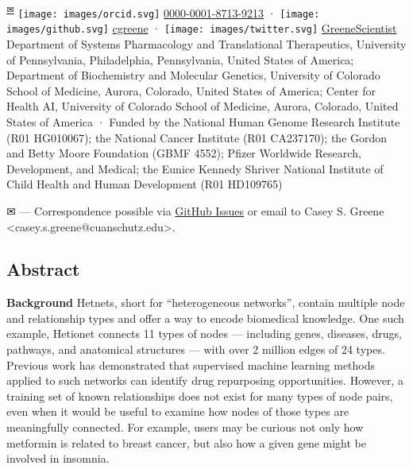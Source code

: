 \begin{itemize}
  \textsuperscript{\protect\hyperlink{correspondence}{✉}}
  \texttt{[image: images/orcid.svg]}
  \href{https://orcid.org/0000-0001-8713-9213}{0000-0001-8713-9213}
  · \texttt{[image: images/github.svg]}
  \href{https://github.com/cgreene}{cgreene}
  · \texttt{[image: images/twitter.svg]}
  \href{https://twitter.com/GreeneScientist}{GreeneScientist}
  Department of Systems Pharmacology and Translational Therapeutics, University of Pennsylvania, Philadelphia, Pennsylvania, United States of America; Department of Biochemistry and Molecular Genetics, University of Colorado School of Medicine, Aurora, Colorado, United States of America; Center for Health AI, University of Colorado School of Medicine, Aurora, Colorado, United States of America
  · Funded by the National Human Genome Research Institute (R01 HG010067); the National Cancer Institute (R01 CA237170); the Gordon and Betty Moore Foundation (GBMF 4552); Pfizer Worldwide Research, Development, and Medical; the Eunice Kennedy Shriver National Institute of Child Health and Human Development (R01 HD109765)
\end{itemize}

\leavevmode{}%
✉ --- Correspondence possible via \href{https://github.com/greenelab/connectivity-search-manuscript/issues}{GitHub Issues}
or email to
Casey S. Greene \textless casey.s.greene@cuanschutz.edu\textgreater.

\hypertarget{abstract}{%
\subsection{Abstract}\label{abstract}}

\textbf{Background}
Hetnets, short for ``heterogeneous networks'', contain multiple node and relationship types and offer a way to encode biomedical knowledge.
One such example, Hetionet connects 11 types of nodes
--- including genes, diseases, drugs, pathways, and anatomical structures
--- with over 2 million edges of 24 types.
Previous work has demonstrated that supervised machine learning methods applied to such networks can identify drug repurposing opportunities.
However, a training set of known relationships does not exist for many types of node pairs,
even when it would be useful to examine how nodes of those types are meaningfully connected.
For example, users may be curious not only how metformin is related to breast cancer,
but also how a given gene might be involved in insomnia.

